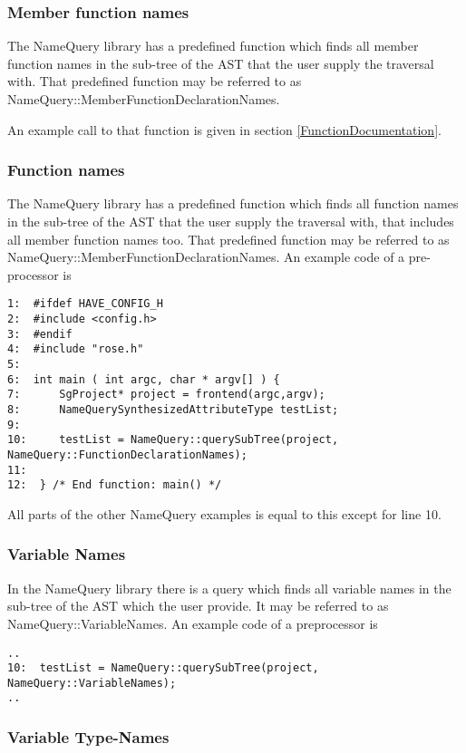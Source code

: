 {\subsubsection{Member function names}

The NameQuery library has a predefined function which finds all member
function names in the sub-tree of the AST that the user supply the
traversal with. That predefined function may be referred to as
NameQuery::MemberFunctionDeclarationNames. 

An example call to that function is given in section \ref{FunctionDocumentation}.


\subsubsection{Function names}


The NameQuery library has a predefined function which finds all 
function names in the sub-tree of the AST that the user supply the
traversal with, that includes all member function names too. That
predefined function may be referred to as
NameQuery::MemberFunctionDeclarationNames. An example code of a
pre-processor is
\begin{verbatim}
1:  #ifdef HAVE_CONFIG_H
2:  #include <config.h>
3:  #endif
4:  #include "rose.h"
5:
6:  int main ( int argc, char * argv[] ) {
7:      SgProject* project = frontend(argc,argv);
8:      NameQuerySynthesizedAttributeType testList;
9:  
10:     testList = NameQuery::querySubTree(project, NameQuery::FunctionDeclarationNames);
11:
12:  } /* End function: main() */
\end{verbatim}
All parts of the other NameQuery examples is equal to this except for line 10.

\subsubsection{Variable Names}

In the NameQuery library there is a query which finds all variable
names in the sub-tree of the AST which the user provide. It may be
referred to as NameQuery::VariableNames. An example code of a
preprocessor is
\begin{verbatim}
..  
10:  testList = NameQuery::querySubTree(project, NameQuery::VariableNames);
..
\end{verbatim}


\subsubsection{Variable Type-Names}

}
